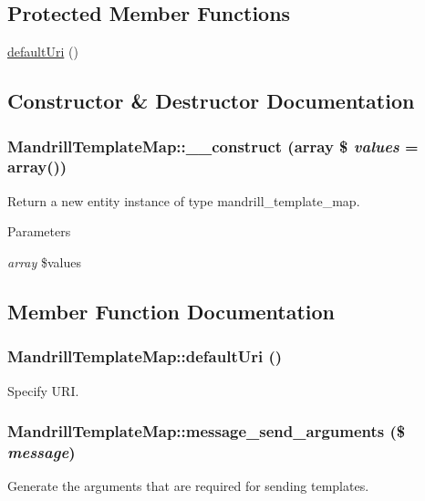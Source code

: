 \subsection*{Protected Member Functions}
\begin{DoxyCompactItemize}
\item 
\hyperlink{classMandrillTemplateMap_ab3aa2ea4daf9056e4c18b4bb7f6601d0}{defaultUri} ()
\end{DoxyCompactItemize}


\subsection{Constructor \& Destructor Documentation}
\hypertarget{classMandrillTemplateMap_ac983d8fda2727b3a2bdc0a949e9ada98}{
\subsubsection[{\_\-\_\-construct}]{\setlength{\rightskip}{0pt plus 5cm}MandrillTemplateMap::\_\-\_\-construct (array \$ {\em values} = {\ttfamily array()})}}
\label{classMandrillTemplateMap_ac983d8fda2727b3a2bdc0a949e9ada98}
Return a new entity instance of type mandrill\_\-template\_\-map.


\begin{DoxyParams}{Parameters}
\item[{\em array}]\$values \end{DoxyParams}


\subsection{Member Function Documentation}
\hypertarget{classMandrillTemplateMap_ab3aa2ea4daf9056e4c18b4bb7f6601d0}{
\subsubsection[{defaultUri}]{\setlength{\rightskip}{0pt plus 5cm}MandrillTemplateMap::defaultUri ()}}
\label{classMandrillTemplateMap_ab3aa2ea4daf9056e4c18b4bb7f6601d0}
Specify URI. \hypertarget{classMandrillTemplateMap_aa73b457572cabc978e552d654ba71579}{
\subsubsection[{message\_\-send\_\-arguments}]{\setlength{\rightskip}{0pt plus 5cm}MandrillTemplateMap::message\_\-send\_\-arguments (\$ {\em message})}}
\label{classMandrillTemplateMap_aa73b457572cabc978e552d654ba71579}
Generate the arguments that are required for sending templates.

